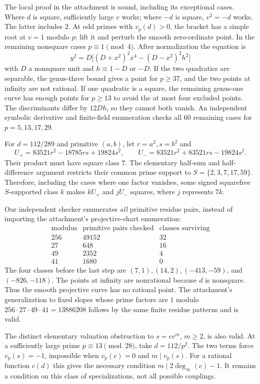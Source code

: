 \documentclass[11pt,a4paper]{article}
\begin{document}
The local proof in the attachment is sound, including its exceptional
cases. Where $d$ is square, sufficiently large $v$ works; where $-d$ is
square, $v^2=-d$ works. The latter includes $2$. At odd primes with
$v_p(d)>0$, the bracket has a simple root at $v=1$ modulo $p$; lift it
and perturb the smooth zero-ordinate point. In the remaining nonsquare
cases $p\equiv1\pmod4$. After normalization the equation is
\[
 y^2=D\big[(D+x^2)^2x^4-(D-x^2)^2h^2\big]
\]
with $D$ a nonsquare unit and $h\equiv1-D$ or $-D$. If the two quadratics
are separable, the genus-three bound gives a point for $p\ge37$, and the
two points at infinity are not rational. If one quadratic is a square,
the remaining genus-one curve has enough points for $p\ge13$ to avoid
the at most four excluded points. The discriminants differ by $12Dh$,
so they cannot both vanish. An independent symbolic derivative and
finite-field enumeration checks all $60$ remaining cases for
$p=5,13,17,29$.

For $d=112/289$ and primitive $(a,b)$, let $r=a^2,s=b^2$ and
\[
 U_+=83521r^2-18785rs+19824s^2,\qquad
 U_-=83521r^2+83521rs-19824s^2.
\]
Their product must have square class $7$. The elementary half-sum and
half-difference argument restricts their common prime support to
$S=\{2,3,7,17,59\}$. Therefore, including the cases where one factor
vanishes, some signed squarefree $S$-supported class $k$ makes
$kU_+$ and $jU_-$ squares, where $j$ represents $7k$.

Our independent checker enumerates \emph{all} primitive residue pairs,
instead of importing the attachment's projective-chart enumeration:
\[
\begin{array}{c|r|r}
\text{modulus}&\text{primitive pairs checked}&\text{classes surviving}\\\hline
256&49152&32\\27&648&16\\49&2352&4\\41&1680&0
\end{array}
\]
The four classes before the last step are $(7,1),(14,2),(-413,-59)$,
and $(-826,-118)$. The points at infinity are nonrational because $d$
is nonsquare. Thus the smooth projective curve has no rational point.
The attachment's generalization to fixed slopes whose prime factors
are $1$ modulo $256\cdot27\cdot49\cdot41=13886208$ follows by the
same finite residue patterns and is valid.

The distinct elementary valuation obstruction to $s=cv^m$, $m\ge2$,
is also valid. At a sufficiently large prime $p\equiv13\pmod{28}$,
take $d=112/p^2$. The two terms force $v_p(s)=-1$, impossible when
$v_p(c)=0$ and $m\mid v_p(s)$. For a rational function $c(d)$ this
gives the necessary condition $m\mid 2\deg_\infty(c)-1$. It remains a
condition on this class of specializations, not all possible couplings.
\end{document}
